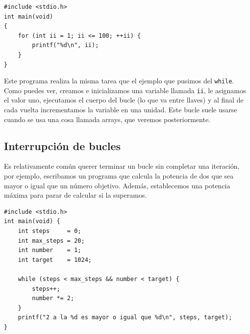 \documentclass[a4paper]{article}
\begin{document}
\noindent
\begin{minipage}[H]{\linewidth}
\mbox{}
\begin{lstlisting}[style=C,
caption={Ejemplo de programa con un bucle \texttt{for}},
label={lst:forStructure}]
#include <stdio.h>
int main(void)
{
    for (int ii = 1; ii <= 100; ++ii) {
        printf("%d\n", ii);
    }
}
\end{lstlisting}
\end{minipage}


Este programa realiza la misma tarea que el ejemplo que pusimos del
\texttt{while}. Como puedes ver, creamos e inicializamos una variable llamada
\texttt{ii}, le asignamos el valor uno, ejecutamos el cuerpo del bucle (lo que
va entre llaves) y al final de cada vuelta incrementamos la variable en
una unidad. Este
bucle suele usarse cuando se usa una cosa llamada arrays, que
veremos posteriormente.

\subsection{Interrupción de bucles}

Es relativamente común querer terminar un bucle sin completar una iteración,
por ejemplo, escribamos un programa que calcula la potencia de dos que
sea mayor o igual que un número objetivo. Además, establecemos una potencia
máxima para parar de calcular si la superamos.

\noindent
\begin{minipage}[H]{\linewidth}
\mbox{}
\begin{lstlisting}[style=C,
caption={Ejemplo de interrupción de un bucle con una variable auxiliar},
label={lst:loopInterruption}]
#include <stdio.h>
int main(void) {
    int steps     = 0;
    int max_steps = 20;
    int number    = 1;
    int target    = 1024;

    while (steps < max_steps && number < target) {
        steps++;
        number *= 2;
    }
    printf("2 a la %d es mayor o igual que %d\n", steps, target);
}
\end{lstlisting}
\end{minipage}
\end{document}
